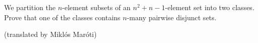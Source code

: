 We partition the $n$-element subsets of an $n^2+n-1$-element set into two classes. Prove that one of the classes contains $n$-many pairwise disjunct sets.

(translated by Miklós Maróti)